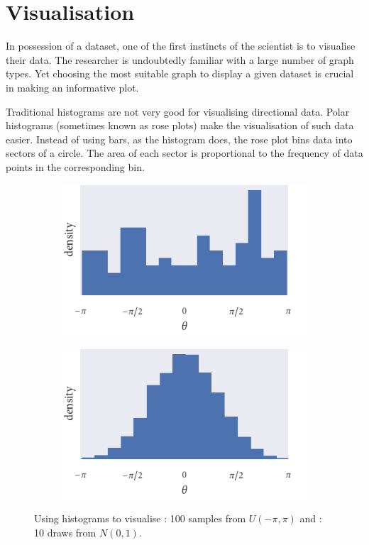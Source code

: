 \section{Visualisation}
\label{sec:circular_visualisation}

In possession of a dataset, one of the first instincts of the scientist is to visualise their data. 
The researcher is undoubtedly familiar with a large number of graph types. Yet choosing the most 
suitable graph to display a given dataset is crucial in making an informative plot.

Traditional histograms are not very good for visualising directional data. Polar histograms 
(sometimes known as rose plots) make the visualisation of such data easier. Instead of using bars, as 
the histogram does, the rose plot bins data into sectors of a circle. The area of each sector is 
proportional to the frequency of data points in the corresponding bin.

\begin{figure}
	\begin{subfigure}[b]{0.48\textwidth}
		\includegraphics{unif_angle_hist.pdf}
		\caption{}
		\label{subfig:unif_angle_hist}
	\end{subfigure}%
	\hspace{0.01\textwidth}
	\begin{subfigure}[b]{0.48\textwidth}
		\includegraphics{norm_angle_hist.pdf}
		\caption{}
		\label{subfig:norm_angle_hist}
	\end{subfigure}
	\caption{Using histograms to visualise : 100 samples from $U(-\pi, 
\pi)$ and : 10 draws from $N(0, 1)$.}
	\label{fig:angle_hist}
\end{figure}


